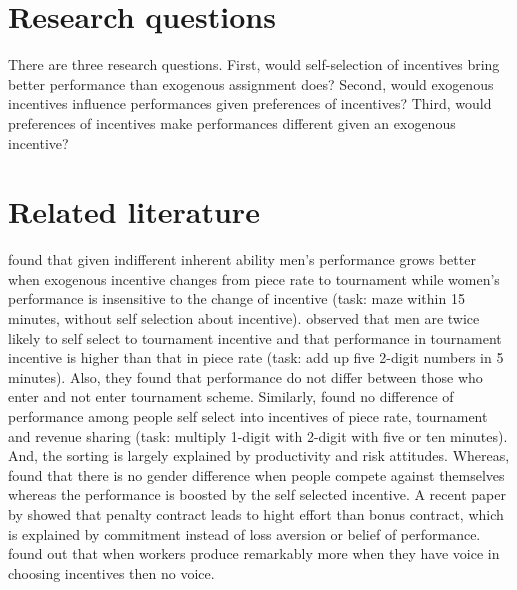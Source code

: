 \documentclass[12pt]{article}
\begin{document}
\section{Research questions}

There are three research questions. First, would self-selection of incentives bring better performance than exogenous assignment does?  Second, would exogenous incentives influence performances given preferences of incentives? Third, would preferences of incentives make performances different given an exogenous incentive?

\section{Related literature}

\citet{Gneezy2003} found that given indifferent inherent ability men's performance grows better when exogenous incentive changes from piece rate to tournament while women's performance is insensitive to the change of incentive (task: maze within 15 minutes, without self selection about incentive). \citet{Niederle2007} observed that men are twice likely to self select to tournament incentive and that performance in tournament incentive is higher than that in piece rate (task: add up five 2-digit numbers in 5 minutes). Also, they found that performance do not differ between those who enter and not enter tournament scheme. Similarly, \citet{Dohmen2011a} found no difference of performance among people self select into incentives of piece rate, tournament and revenue sharing (task: multiply 1-digit with 2-digit with five or ten minutes). And, the sorting is largely explained by productivity and risk attitudes. Whereas, \citet{Apicella2017} found that there is no gender difference when people compete against themselves whereas the performance is boosted by the self selected incentive. A recent paper by \citep{Quidt2017} showed that penalty contract leads to hight effort than bonus contract, which is explained by commitment instead of loss aversion or belief of performance. \citet{Mellizo2017} found out that when workers produce remarkably more when they have voice in choosing incentives then no voice. %
\end{document}
